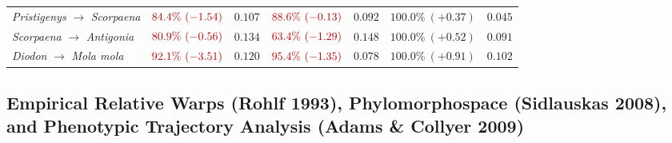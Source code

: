 \documentclass[11pt,a4paper]{article}
\theoremstyle{definition}
\theoremstyle{remark}
\begin{document}
\begin{table}[H]
{\begin{tabular}{@{}lcccccc@{}}
\emph{Pristigenys} $\to$ \emph{Scorpaena} & $\textcolor{red!75!black}{84.4\%\ (-1.54)}$ & $0.107$ & $\textcolor{red!75!black}{88.6\%\ (-0.13)}$ & $0.092$ & $\mathbf{100.0\%\ (+0.37)}$ & $\mathbf{0.045}$ \\
\emph{Scorpaena} $\to$ \emph{Antigonia} & $\textcolor{red!75!black}{80.9\%\ (-0.56)}$ & $0.134$ & $\textcolor{red!75!black}{63.4\%\ (-1.29)}$ & $0.148$ & $\mathbf{100.0\%\ (+0.52)}$ & $\mathbf{0.091}$ \\
\emph{Diodon} $\to$ \emph{Mola mola} & $\textcolor{red!75!black}{92.1\%\ (-3.51)}$ & $0.120$ & $\textcolor{red!75!black}{95.4\%\ (-1.35)}$ & $\mathbf{0.078}$ & $\mathbf{100.0\%\ (+0.91)}$ & $0.102$ \\
\bottomrule
\end{tabular}%
}
\end{table}

\subsection{Empirical Relative Warps (Rohlf 1993), Phylomorphospace (Sidlauskas 2008), and Phenotypic Trajectory Analysis (Adams \& Collyer 2009)}
\end{document}
